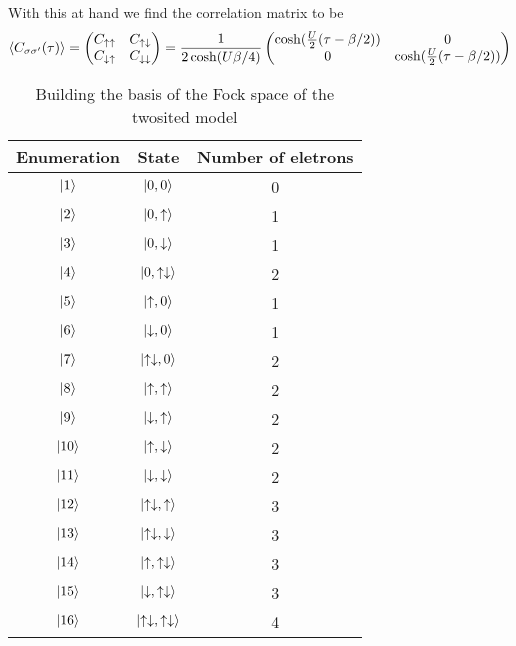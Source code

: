 With this at hand we find the correlation matrix to be
\begin{equation}
\braket{C_{\sigma\sigma^{\prime}}(\tau)}= 
\begin{pmatrix}
C_{\uparrow\uparrow} & C_{\uparrow\downarrow} \\
C_{\downarrow\uparrow} & C_{\downarrow\downarrow}
\end{pmatrix}
=\frac{1}{2\cosh(U\beta/4)}
\begin{pmatrix}
\cosh(\frac{U}{2}(\tau-\beta/2)) & 0\\
0 & \cosh(\frac{U}{2}(\tau-\beta/2))
\end{pmatrix}
	\label{correlator1}
\end{equation}
\begin{table}
	\centering	
	\begin{tabular}{ccc}
		
		\hline  
		Enumeration & State & Number of eletrons \\
		\hline
		$\ket{1}$ & $\ket{0,0}$ & 0\\
		$\ket{2}$ & $\ket{0,\uparrow}$ & 1\\
		$\ket{3}$ & $\ket{0,\downarrow}$ & 1\\
		$\ket{4}$ & $\ket{0,\uparrow\downarrow}$ & 2\\
		$\ket{5}$ & $\ket{\uparrow,0}$ & 1\\
		$\ket{6}$ & $\ket{\downarrow,0}$ & 1\\
		$\ket{7}$ & $\ket{\uparrow\downarrow,0}$ & 2\\
		$\ket{8}$ & $\ket{\uparrow,\uparrow}$ & 2\\
		$\ket{9}$ & $\ket{\downarrow, \uparrow}$ & 2\\
		$\ket{10}$ & $\ket{\uparrow, \downarrow}$ & 2\\
		$\ket{11}$ & $\ket{\downarrow, \downarrow}$ & 2\\
		$\ket{12}$ & $\ket{\uparrow\downarrow, \uparrow}$ & 3\\
		$\ket{13}$ & $\ket{\uparrow\downarrow, \downarrow}$ & 3\\
		$\ket{14}$ & $\ket{\uparrow,\uparrow\downarrow}$ & 3\\
		$\ket{15}$ & $\ket{\downarrow, \uparrow\downarrow}$ & 3\\
		$\ket{16}$ & $\ket{\uparrow\downarrow,\uparrow\downarrow}$ & 4\\
	\end{tabular}
	\caption{Building the basis of the Fock space of the twosited model}
	\label{fock2}
\end{table}
